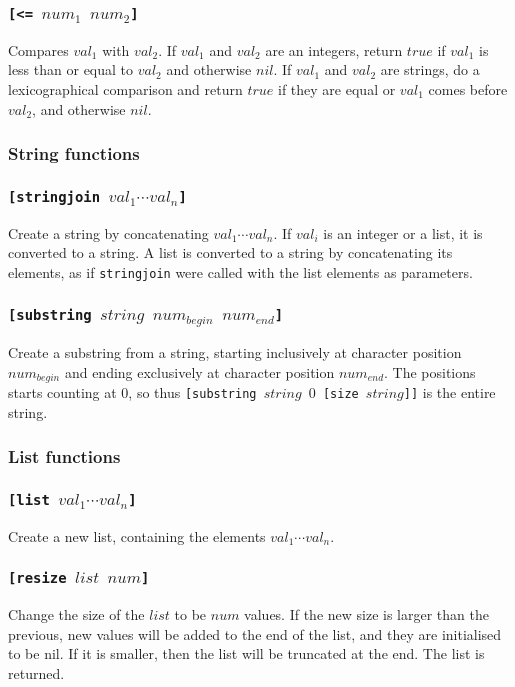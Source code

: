 \documentclass[11pt]{report}
\begin{document}
\subsubsection*{\tt{[<= }$num_1$ $num_2$\tt{]}}
Compares $val_1$ with $val_2$. If $val_1$ and $val_2$ are an integers, return $true$ if $val_1$ is less than or equal to $val_2$ and otherwise $nil$.
If $val_1$ and $val_2$ are strings, do a lexicographical comparison and return $true$ if they are equal or $val_1$ comes before $val_2$, and otherwise $nil$.

\subsubsection{String functions}
\subsubsection*{\tt{[stringjoin }$val_1\cdots val_n$\tt{]}}
Create a string by concatenating $val_1\cdots val_n$.
If $val_i$ is an integer or a list, it is converted to a string.
A list is converted to a string by concatenating its elements, as if {\tt stringjoin} were called with the list elements as parameters.

\subsubsection*{\tt{[substring }$string$ $num_{begin}$ $num_{end}$\tt{]}}
Create a substring from a string, starting inclusively at character position $num_{begin}$ and ending exclusively at character position $num_{end}$. The positions starts counting at $0$, so thus {\tt{[substring }$string$ $0$ \tt{[size }$string$\tt{]]}} is the entire string.

\subsubsection{List functions}
\subsubsection*{\tt{[list }$val_1\cdots val_n$\tt{]}}
Create a new list, containing the elements $val_1\cdots val_n$.

\subsubsection*{\tt{[resize }$list$ $num$\tt{]}}
Change the size of the $list$ to be $num$ values. 
If the new size is larger than the previous, new values will be added to the end of the list, and they are initialised to be nil. If it is smaller, then the list will be truncated at the end. The list is returned.
\end{document}
